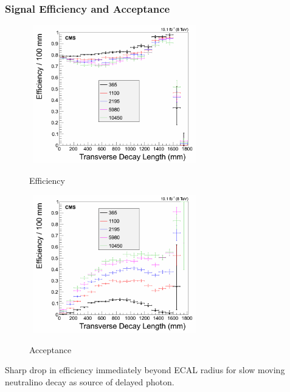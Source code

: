 \documentclass{beamer}
\begin{document}
\begin{frame}
 \frametitle{Signal Efficiency and Acceptance}
\begin{figure}[ht]
\begin{minipage}[b]{0.45\linewidth}
\centering
\mbox{
\includegraphics[height=6cm,width=\textwidth]{THESISPLOTS/Eff_ctbgT.png}}
\vspace{-1cm}
\caption{Efficiency}
\end{minipage}
\hspace{0.1cm}
\begin{minipage}[b]{0.45\linewidth}
\centering
\mbox{
\includegraphics[height=6cm, width=\textwidth]{THESISPLOTS/Accp_ctbgT.png}}
\vspace{-1cm}
\caption{Acceptance}
\end{minipage}
\end{figure}
 Sharp drop in efficiency immediately beyond ECAL radius for slow moving neutralino decay as source of delayed photon.

\end{frame}
\end{document}

